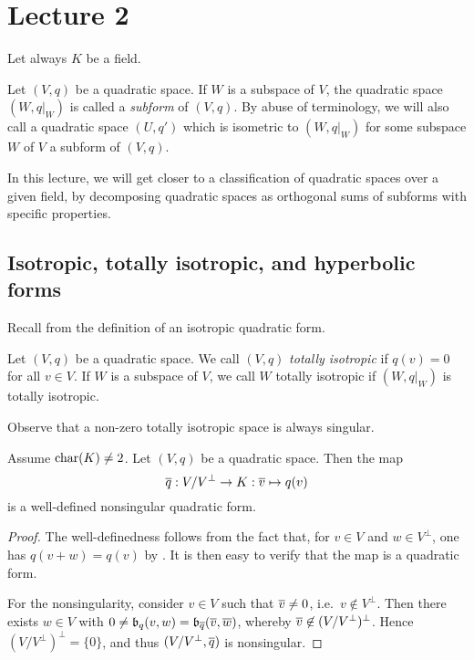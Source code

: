 \documentclass[12pt, leqno, british]{amsart}
\author{Nicolas Daans}
\begin{document}
\section{Lecture 2}
Let always $K$ be a field.
\begin{defi}
Let $(V, q)$ be a quadratic space.
If $W$ is a subspace of $V$, the quadratic space $(W, q\vert_W)$ is called a \emph{subform} of $(V, q)$.
By abuse of terminology, we will also call a quadratic space $(U, q')$ which is isometric to $(W, q\vert_W)$ for some subspace $W$ of $V$ a subform of $(V, q)$.
\end{defi}
In this lecture, we will get closer to a classification of quadratic spaces over a given field, by decomposing quadratic spaces as orthogonal sums of subforms with specific properties.

\subsection{Isotropic, totally isotropic, and hyperbolic forms}

Recall from  the definition of an isotropic quadratic form.
\begin{defi}
Let $(V, q)$ be a quadratic space.
We call $(V, q)$ \emph{totally isotropic} if $q(v) = 0$ for all $v \in V$.
If $W$ is a subspace of $V$, we call $W$ totally isotropic if $(W, q\vert_W)$ is totally isotropic.
\end{defi}
Observe that a non-zero totally isotropic space is always singular.
\begin{prop}\label{P:radical-residue}
Assume $\operatorname{char}(K) \neq 2$. Let $(V, q)$ be a quadratic space.
Then the map
$$ \overline{q} : V/V^\perp \to K : \overline{v} \mapsto q(v)$$
is a well-defined nonsingular quadratic form.
\end{prop}
\begin{proof}
The well-definedness follows from the fact that, for $v \in V$ and $w \in V^\perp$, one has $q(v + w) = q(v)$ by .
It is then easy to verify that the map is a quadratic form.

For the nonsingularity, consider $v \in V$ such that $\overline{v} \neq 0$, i.e.~$v \not\in V^\perp$.
Then there exists $w \in V$ with $0 \neq \mathfrak{b}_q(v, w) = \mathfrak{b}_{\overline{q}}(\overline{v}, \overline{w})$, whereby $\overline{v} \not\in (V/V^\perp)^\perp$.
Hence $(V/V^\perp)^\perp = \lbrace 0 \rbrace$, and thus $(V/V^\perp, \overline{q})$ is nonsingular.
\end{proof}
\end{document}
